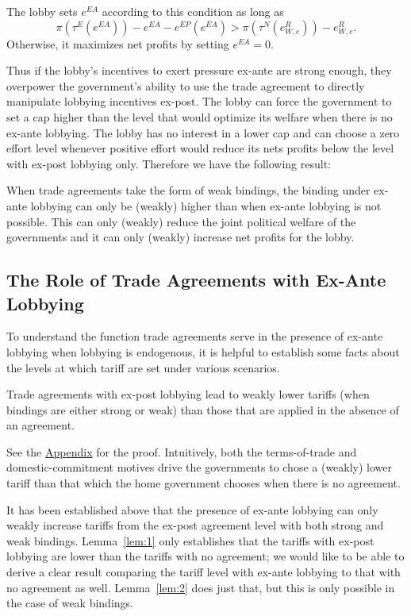 The lobby sets $e^{EA}$ according to this condition as long as 
	\begin{equation}
		\pi(\tau^E(e^{EA})) - e^{EA} - e^{EP}(e^{EA}) > \pi(\tau^N(e^R_{W,e})) - e^R_{W,e}.
		\label{ine:ea}
	\end{equation}
Otherwise, it maximizes net profits by setting $e^{EA} =0$.	

Thus if the lobby's incentives to exert pressure ex-ante are strong enough, they overpower the government's ability to use the trade agreement to directly manipulate lobbying incentives ex-post. The lobby can force the government to set a cap higher than the level that would optimize its welfare when there is no ex-ante lobbying. The lobby has no interest in a lower cap and can choose a zero effort level whenever positive effort would reduce its nets profits below the level with ex-post lobbying only. Therefore we have the following result:
		
\begin{result}
	When trade agreements take the form of weak bindings, the binding under ex-ante lobbying can only be (weakly) higher than when ex-ante lobbying is not possible. This can only (weakly) reduce the joint political welfare of the governments and it can only (weakly) increase net profits for the lobby.
\end{result}

\subsection{The Role of Trade Agreements with Ex-Ante Lobbying}				
To understand the function trade agreements serve in the presence of ex-ante lobbying when lobbying is endogenous, it is helpful to establish some facts about the levels at which tariff are set under various scenarios.

\begin{lemma}
  Trade agreements with ex-post lobbying lead to weakly lower tariffs (when bindings are either strong or weak) than those that are applied in the absence of an agreement.
	\label{lem:1}
\end{lemma}

See the \hyperlink{lem1}{Appendix} for the proof. Intuitively, both the terms-of-trade and domestic-commitment motives drive the governments to chose a (weakly) lower tariff than that which the home government chooses when there is no agreement.

It has been established above that the presence of ex-ante lobbying can only weakly increase tariffs from the ex-post agreement level with both strong and weak bindings. Lemma~\ref{lem:1} only establishes that the tariffs with ex-post lobbying are lower than the tariffs with no agreement; we would like to be able to derive a clear result comparing the tariff level with ex-ante lobbying to that with no agreement as well. Lemma~\ref{lem:2} does just that, but this is only possible in the case of weak bindings.

